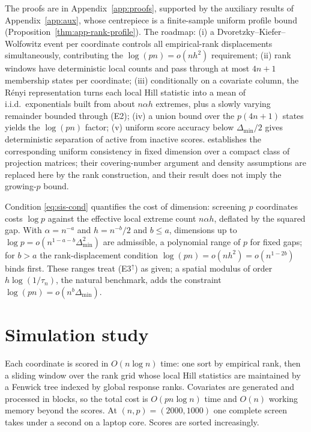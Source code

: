 \documentclass[bj,authoryear]{imsart}
\theoremstyle{plain}
\begin{document}
The proofs are in Appendix~\ref{app:proofs}, supported by the auxiliary
results of Appendix~\ref{app:aux}, whose centrepiece is a finite-sample
uniform profile bound (Proposition~\ref{thm:app-rank-profile}). The
roadmap: (i) a Dvoretzky--Kiefer--Wolfowitz event per coordinate controls
all empirical-rank displacements simultaneously, contributing the
$\log(pn)=o(nh^2)$ requirement; (ii) rank windows have deterministic
local counts and pass through at most $4n+1$ membership states per
coordinate; (iii) conditionally on a covariate column, the R\'enyi
representation turns each local Hill statistic into a mean of
i.i.d.\ exponentials built from about $n\alpha h$ extremes, plus a
slowly varying remainder bounded through (E2); (iv) a union bound over
the $p(4n+1)$ states yields the $\log(pn)$ factor; (v) uniform score
accuracy below $\Delta_{\min}/2$ gives deterministic separation of
active from inactive scores. \citet[Theorem~3]{gardesPodgorny2025}
establishes the corresponding uniform consistency in fixed dimension
over a compact class of projection matrices; their covering-number
argument and density assumptions are replaced here by the rank
construction, and their result does not imply the growing-$p$ bound.

Condition \eqref{eq:sis-cond} quantifies the cost of dimension:
screening $p$ coordinates costs $\log p$ against the effective local
extreme count $n\alpha h$, deflated by the squared gap. With
$\alpha=n^{-a}$ and $h=n^{-b}/2$ and $b\le a$, dimensions up to
$\log p=o(n^{1-a-b}\Delta_{\min}^2)$ are admissible, a polynomial range
of $p$ for fixed gaps; for $b>a$ the rank-displacement condition
$\log(pn)=o(nh^2)=o(n^{1-2b})$ binds first. These ranges treat (E3$^{\uparrow}$) as given; a spatial modulus of order
$h\log(1/\tau_n)$, the natural benchmark, adds the constraint
$\log(pn)=o(n^{b}\Delta_{\min})$.


\section{Simulation study}\label{sec:simulation}

Each coordinate is scored in $O(n\log n)$ time: one sort by empirical
rank, then a sliding window over the rank grid whose local Hill statistics
are maintained by a Fenwick tree indexed by global response ranks.
Covariates are generated and processed in blocks, so the total cost is
$O(pn\log n)$ time and $O(n)$ working memory beyond the scores. At
$(n,p)=(2000,1000)$ one complete screen takes under a second on a laptop
core. Scores are sorted increasingly.
\end{document}
